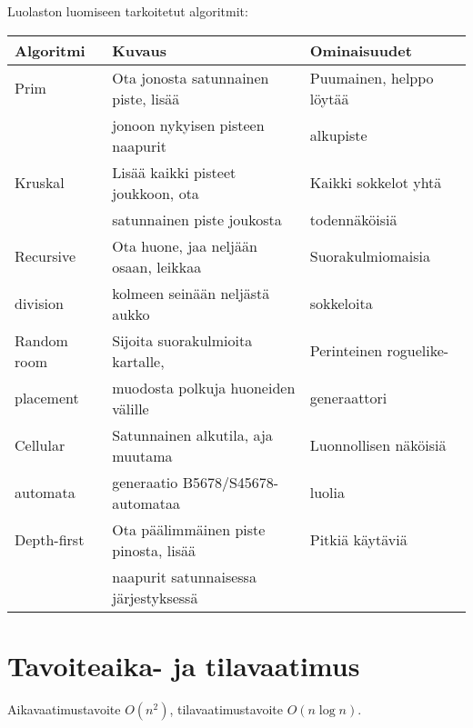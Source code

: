 \documentclass{article}
\begin{document}
\noindent
Luolaston luomiseen tarkoitetut algoritmit:
\begin{table}[h]
\begin{tabular}{| l | p{6.5cm} | l |}
\hline
\rowcolor{Gray}
Algoritmi   & Kuvaus                                & Ominaisuudet              \\ \hline
Prim        & Ota jonosta satunnainen piste, lisää  & Puumainen, helppo löytää  \\
            & jonoon nykyisen pisteen naapurit      & alkupiste                 \\ \hline
Kruskal     & Lisää kaikki pisteet joukkoon, ota    & Kaikki sokkelot yhtä      \\
            & satunnainen piste joukosta            & todennäköisiä             \\ \hline
Recursive   & Ota huone, jaa neljään osaan, leikkaa & Suorakulmiomaisia         \\ 
division    & kolmeen seinään neljästä aukko        & sokkeloita                \\ \hline
Random room & Sijoita suorakulmioita kartalle,      & Perinteinen roguelike-    \\ 
placement   & muodosta polkuja huoneiden välille    & generaattori              \\ \hline
Cellular    & Satunnainen alkutila, aja muutama     & Luonnollisen näköisiä     \\ 
automata    & generaatio B5678/S45678-automataa     & luolia                    \\ \hline
Depth-first & Ota päälimmäinen piste pinosta, lisää & Pitkiä käytäviä           \\ 
            & naapurit satunnaisessa järjestyksessä &                           \\ \hline
\end{tabular}
\end{table}

\section{Tavoiteaika- ja tilavaatimus}
Aikavaatimustavoite $O(n^2)$, tilavaatimustavoite $O(n \log n)$.
\end{document}
